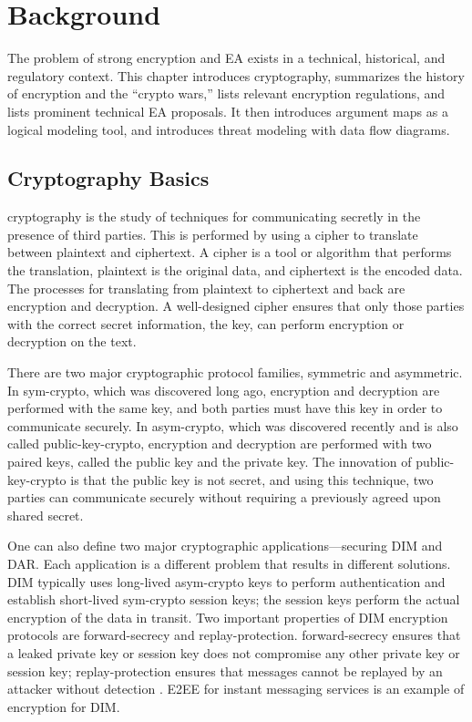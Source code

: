 \chapter{Background}
\label{chap-background}

The problem of strong encryption and \acl{EA} exists in a technical, historical, and regulatory context. This chapter
introduces cryptography, summarizes the history of encryption and the ``crypto wars,'' lists relevant encryption
regulations, and lists prominent technical \ac{EA} proposals. It then introduces argument maps as a logical modeling
tool, and introduces threat modeling with data flow diagrams.



\section{Cryptography Basics}
\label{sec-crypto-basics}

\Ac{cryptography} is the study of techniques for communicating secretly in the presence of third parties. This is
performed by using a \ac{cipher} to translate between \ac{plaintext} and \ac{ciphertext}. A cipher is a tool or
algorithm that performs the translation, plaintext is the original data, and ciphertext is the encoded data. The
processes for translating from plaintext to ciphertext and back are \ac{encryption} and \ac{decryption}. A well-designed
cipher ensures that only those parties with the correct secret information, the \ac{key}, can perform encryption or
decryption on the text.


There are two major cryptographic protocol families, symmetric and asymmetric. In \ac{sym-crypto}, which was discovered
long ago, encryption and decryption are performed with the same key, and both parties must have this key in order to
communicate securely. In \ac{asym-crypto}, which was discovered recently and is also called \ac{public-key-crypto},
encryption and decryption are performed with two paired keys, called the public key and the private key. The innovation
of \ac{public-key-crypto} is that the public key is not secret, and using this technique, two parties can communicate
securely without requiring a previously agreed upon shared secret.

One can also define two major cryptographic applications---securing \acf{DIM} and \acf{DAR}. Each application is a
different problem that results in different solutions. \Ac{DIM} typically uses long-lived \ac{asym-crypto} keys to
perform authentication and establish short-lived \ac{sym-crypto} session keys; the session keys perform the actual
encryption of the data in transit. Two important properties of \ac{DIM} encryption protocols are \ac{forward-secrecy}
and \ac{replay-protection}. \Ac{forward-secrecy} ensures that a leaked private key or session key does not compromise
any other private key or session key; \ac{replay-protection} ensures that messages cannot be replayed by an
attacker without detection \cite{bellovin_thinking_2016}. \Ac{E2EE} for instant messaging services is an example of
encryption for \ac{DIM}.

